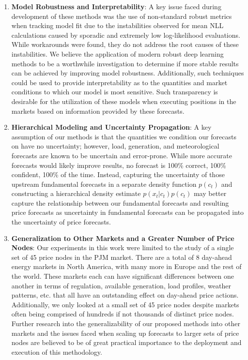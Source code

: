 \begin{enumerate}
    \item \textbf{Model Robustness and Interpretability}: A key issue faced during development of these methods was
          the use of non-standard robust metrics when tracking model fit due to the instabilities observed for mean
          NLL calculations caused by sporadic and extremely low log-likelihood evaluations.
          While workarounds were found, they do not address the root causes of these instabilities.
          We believe the application of modern robust deep learning methods to be a worthwhile investigation to determine
          if more stable results can be achieved by improving model robustness.
          Additionally, such techniques could be used to provide interpretability as to the quantities and market
          conditions to which our model is most sensitive.
          Such transparency is desirable for the utilization of these models when executing positions in the markets
          based on information provided by these forecasts.
    \item \textbf{Hierarchical Modeling and Uncertainty Propagation}: A key assumption of our methods is that the
          quantities we condition our forecasts on have no uncertainty; however, load, generation, and meteorological
          forecasts are known to be uncertain and error-prone.
          While more accurate forecasts would likely improve results, no forecast is 100\% correct, 100\% confident, 100\%
          of the time.
          Instead, capturing the uncertainty of those upstream fundamental forecasts in a separate density function
          $p(c_t)$ and constructing a hierarchical density estimate $p(x_t|c_t)p(c_t)$ may better capture the
          relationship between our fundamental forecasts and resulting price forecasts as uncertainty in fundamental
          forecasts can be propagated into the uncertainty of price forecasts.
    \item \textbf{Generalization to Other Markets and a Greater Number of Price Nodes}: Our experiments in this work
          were limited to the study of a single set of 45 price nodes in the PJM market.
          There are a total of 8 day-ahead energy markets in North America, with many more in Europe and the rest of the
          world.
          These markets each can have significant differences between one another in terms of regulation, available
          generation, load profiles, weather patterns, etc. that all have an outstanding effect on day-ahead price actions.
          Additionally, we only looked at a small set of 45 price nodes despite markets often being comprised of hundreds
          if not thousands of distinct price nodes.
          Further research into the generalizability of our proposed methods into other markets and the
          issues faced when scaling up forecasts to larger sets of price nodes are believed to be of great practical
          importance to the deployment and execution of this methodology.
\end{enumerate}
